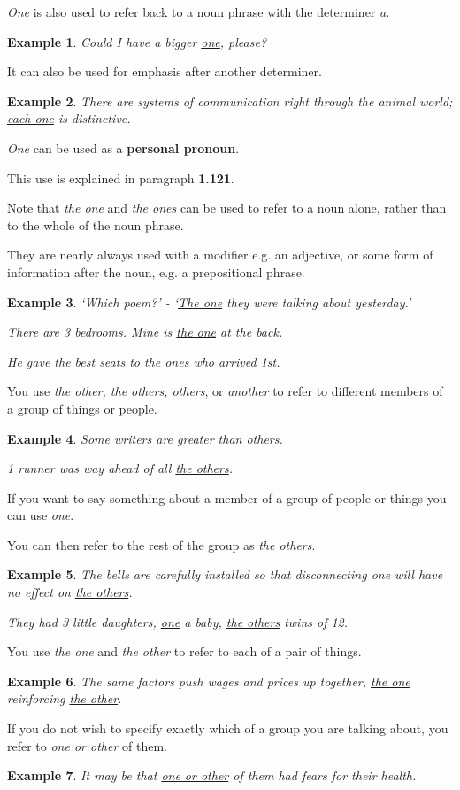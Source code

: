 \documentclass[oneside]{book}
\numberwithin{equation}{section}
\newtheorem{example}{Example}[section]
\begin{document}
%
\textit{One} is also used to refer back to a noun phrase with the determiner \textit{a}.
\begin{example}
    Could I have a bigger \underline{one}, please?
\end{example}
It can also be used for emphasis after another determiner.
\begin{example}
    There are systems of communication right through the animal world; \underline{each one} is distinctive.
\end{example}
\textit{One} can be used as a \textbf{personal pronoun}.

This use is explained in paragraph \textbf{1.121}.

%
\noindent{} Note that \textit{the one} and \textit{the ones} can be used to refer to a noun alone, rather than to the whole of the noun phrase.

They are nearly always used with a modifier e.g. an adjective, or some form of information after the noun, e.g. a prepositional phrase.
\begin{example}
    `Which poem?' - `\underline{The one} they were talking about yesterday.'
    
    There are 3 bedrooms. Mine is \underline{the one} at the back.
    
    He gave the best seats to \underline{the ones} who arrived 1st.
\end{example}
%
\noindent{} You use \textit{the other, the others, others}, or \textit{another} to refer to different members of a group of things or people.
\begin{example}
    Some writers are greater than \underline{others}.
    
    1 runner was way ahead of all \underline{the others}.
\end{example}
%
\noindent{} If you want to say something about a member of a group of people or things you can use \textit{one}.

You can then refer to the rest of the group as \textit{the others}.
\begin{example}
    The bells are carefully installed so that disconnecting one will have no effect on \underline{the others}.
    
    They had 3 little daughters, \underline{one} a baby, \underline{the others} twins of 12.
\end{example}
You use \textit{the one} and \textit{the other} to refer to each of a pair of things.
\begin{example}
    The same factors push wages and prices up together, \underline{the one} reinforcing \underline{the other}.
\end{example}
If you do not wish to specify exactly which of a group you are talking about, you refer to \textit{one or other} of them.
\begin{example}
    It may be that \underline{one or other} of them had fears for their health.
\end{example}
\end{document}
